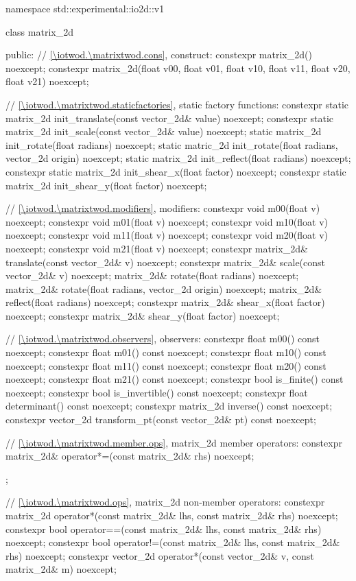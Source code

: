\begin{codeblock}
namespace std::experimental::io2d::v1 {
  class matrix_2d {
  public:
    // \ref{\iotwod.\matrixtwod.cons}, construct:
    constexpr matrix_2d() noexcept;
    constexpr matrix_2d(float v00, float v01, float v10, float v11,
      float v20, float v21) noexcept;
    
    // \ref{\iotwod.\matrixtwod.staticfactories}, static factory functions:
    constexpr static matrix_2d init_translate(const vector_2d& value) noexcept;
    constexpr static matrix_2d init_scale(const vector_2d& value) noexcept;
    static matrix_2d init_rotate(float radians) noexcept;
    static matric_2d init_rotate(float radians, vector_2d origin) noexcept;
    static matrix_2d init_reflect(float radians) noexcept;
    constexpr static matrix_2d init_shear_x(float factor) noexcept;
    constexpr static matrix_2d init_shear_y(float factor) noexcept;
    
    // \ref{\iotwod.\matrixtwod.modifiers}, modifiers:
    constexpr void m00(float v) noexcept;
    constexpr void m01(float v) noexcept;
    constexpr void m10(float v) noexcept;
    constexpr void m11(float v) noexcept;
    constexpr void m20(float v) noexcept;
    constexpr void m21(float v) noexcept;
    constexpr matrix_2d& translate(const vector_2d& v) noexcept;
    constexpr matrix_2d& scale(const vector_2d& v) noexcept;
    matrix_2d& rotate(float radians) noexcept;
    matrix_2d& rotate(float radians, vector_2d origin) noexcept;
    matrix_2d& reflect(float radians) noexcept;
    constexpr matrix_2d& shear_x(float factor) noexcept;
    constexpr matrix_2d& shear_y(float factor) noexcept;
    
    // \ref{\iotwod.\matrixtwod.observers}, observers:
    constexpr float m00() const noexcept;
    constexpr float m01() const noexcept;
    constexpr float m10() const noexcept;
    constexpr float m11() const noexcept;
    constexpr float m20() const noexcept;
    constexpr float m21() const noexcept;
    constexpr bool is_finite() const noexcept;
    constexpr bool is_invertible() const noexcept;
    constexpr float determinant() const noexcept;
    constexpr matrix_2d inverse() const noexcept;
    constexpr vector_2d transform_pt(const vector_2d& pt) const noexcept;
    
    // \ref{\iotwod.\matrixtwod.member.ops}, matrix_2d member operators:
    constexpr matrix_2d& operator*=(const matrix_2d& rhs) noexcept;
  };
    
  // \ref{\iotwod.\matrixtwod.ops}, matrix_2d non-member operators:
  constexpr matrix_2d operator*(const matrix_2d& lhs, const matrix_2d& rhs)
    noexcept;
  constexpr bool operator==(const matrix_2d& lhs, const matrix_2d& rhs)
    noexcept;
  constexpr bool operator!=(const matrix_2d& lhs, const matrix_2d& rhs)
    noexcept;
  constexpr vector_2d operator*(const vector_2d& v, const matrix_2d& m) 
    noexcept;
}
\end{codeblock}

